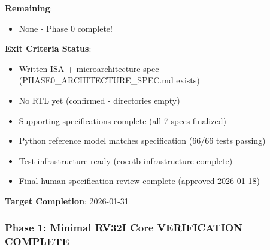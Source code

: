 \begin{record}
\textbf{Remaining}:

\begin{itemize}
\tightlist
\item
  None - Phase 0 complete!
\end{itemize}

\textbf{Exit Criteria Status}:

\begin{itemize}
\tightlist
\item
  \ok{} Written ISA + microarchitecture spec
  (PHASE0\_\allowbreak{}ARCHITECTURE\_\allowbreak{}SPEC.md exists)
\item
  \ok{} No RTL yet (confirmed - directories empty)
\item
  \ok{} Supporting specifications complete (all 7 specs finalized)
\item
  \ok{} Python reference model matches specification (66/66 tests
  passing)
\item
  \ok{} Test infrastructure ready (cocotb infrastructure complete)
\item
  \ok{} Final human specification review complete (approved 2026-01-18)
\end{itemize}

\textbf{Target Completion}: 2026-01-31

\end{record}

\subsubsection{\texorpdfstring{Phase 1: Minimal RV32I Core \ok{}
VERIFICATION
COMPLETE}{Phase 1: Minimal RV32I Core  VERIFICATION COMPLETE}}\label{cr:status:phase-status:phase-1-minimal-rv32i-core-white-check-mark-verification-complete}

